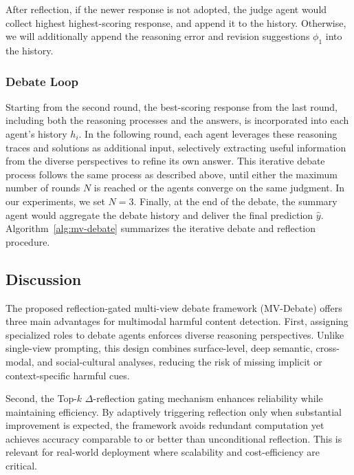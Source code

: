\documentclass[letterpaper]{article} %
\begin{document}
After reflection, if the newer response is not adopted, the judge agent would collect highest highest-scoring response, and append it to the history. Otherwise, we will additionally append the reasoning error and revision suggestions $\phi_{1}$ into the history.


\subsubsection{Debate Loop}


Starting from the second round, the best-scoring response from the last round, including both the reasoning processes and the answers, is incorporated into each agent’s history $h_i$. In the following round, each agent leverages these reasoning traces and solutions as additional input, selectively extracting useful information from the diverse perspectives to refine its own answer. This iterative debate process follows the same process as described above, until either the maximum number of rounds $N$ is reached or the agents converge on the same judgment. In our experiments, we set $N=3$.
Finally, at the end of the debate, the summary agent would aggregate the debate history and deliver the final prediction $\hat{y}$. Algorithm~\ref{alg:mv-debate} summarizes the iterative debate and reflection procedure.





\subsection{Discussion}
\label{subsec:discussion}

The proposed reflection-gated multi-view debate framework (MV-Debate) offers three main advantages for multimodal harmful content detection. First, assigning specialized roles to debate agents enforces diverse reasoning perspectives. Unlike single-view prompting, this design combines surface-level, deep semantic, cross-modal, and social-cultural analyses, reducing the risk of missing implicit or context-specific harmful cues.  

Second, the Top-$k$ $\Delta$-reflection gating mechanism enhances reliability while maintaining efficiency. By adaptively triggering reflection only when substantial improvement is expected, the framework avoids redundant computation yet achieves accuracy comparable to or better than unconditional reflection. This is relevant for real-world deployment where scalability and cost-efficiency are critical.  
\end{document}
